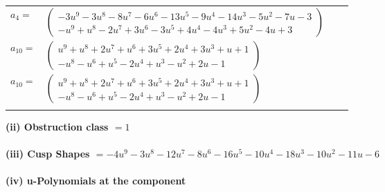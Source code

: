 \documentclass[1p]{elsarticle_modified}
\theoremstyle{definition}
\begin{document}
\begin{tabular}{m{7pt} m{180pt} m{7pt} m{180pt} }
\flushright $a_{4}=$&$\begin{pmatrix}-3 u^9-3 u^8-8 u^7-6 u^6-13 u^5-9 u^4-14 u^3-5 u^2-7 u-3\\- u^9+u^8-2 u^7+3 u^6-3 u^5+4 u^4-4 u^3+5 u^2-4 u+3\end{pmatrix}$ \\
\flushright $a_{10}=$&$\begin{pmatrix}u^9+u^8+2 u^7+u^6+3 u^5+2 u^4+3 u^3+u+1\\- u^8- u^6+u^5-2 u^4+u^3- u^2+2 u-1\end{pmatrix}$\\ \flushright $a_{10}=$&$\begin{pmatrix}u^9+u^8+2 u^7+u^6+3 u^5+2 u^4+3 u^3+u+1\\- u^8- u^6+u^5-2 u^4+u^3- u^2+2 u-1\end{pmatrix}$\\&\end{tabular}
\flushleft \textbf{(ii) Obstruction class $= 1$}\\~\\
\flushleft \textbf{(iii) Cusp Shapes $= -4 u^9-3 u^8-12 u^7-8 u^6-16 u^5-10 u^4-18 u^3-10 u^2-11 u-6$}\\~\\
\newpage\renewcommand{\arraystretch}{1}
\flushleft \textbf{(iv) u-Polynomials at the component}\newline \\
\end{document}
